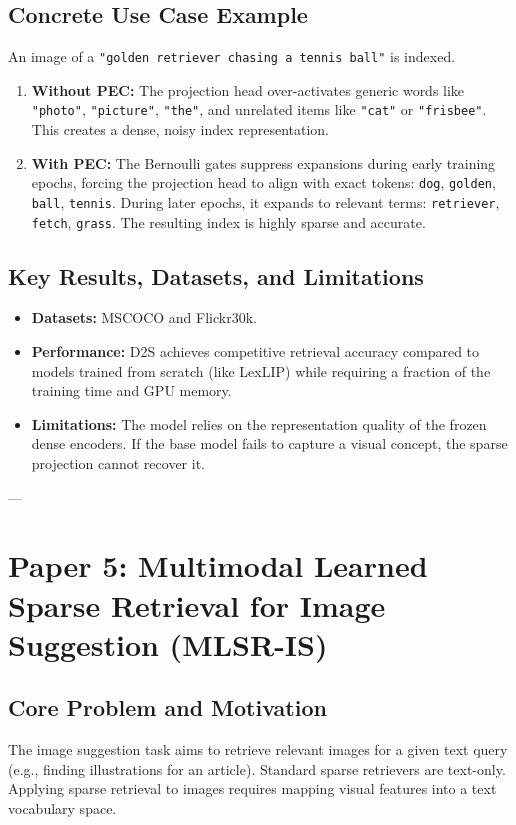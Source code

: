 \documentclass[11pt,a4paper]{article}
\begin{document}
\subsection{Concrete Use Case Example}
An image of a \texttt{"golden retriever chasing a tennis ball"} is indexed.
\begin{enumerate}
    \item \textbf{Without PEC:} The projection head over-activates generic words like \texttt{"photo"}, \texttt{"picture"}, \texttt{"the"}, and unrelated items like \texttt{"cat"} or \texttt{"frisbee"}. This creates a dense, noisy index representation.
    \item \textbf{With PEC:} The Bernoulli gates suppress expansions during early training epochs, forcing the projection head to align with exact tokens: \texttt{dog}, \texttt{golden}, \texttt{ball}, \texttt{tennis}. During later epochs, it expands to relevant terms: \texttt{retriever}, \texttt{fetch}, \texttt{grass}. The resulting index is highly sparse and accurate.
\end{enumerate}

\subsection{Key Results, Datasets, and Limitations}
\begin{itemize}
    \item \textbf{Datasets:} MSCOCO and Flickr30k.
    \item \textbf{Performance:} D2S achieves competitive retrieval accuracy compared to models trained from scratch (like LexLIP) while requiring a fraction of the training time and GPU memory.
    \item \textbf{Limitations:} The model relies on the representation quality of the frozen dense encoders. If the base model fails to capture a visual concept, the sparse projection cannot recover it.
\end{itemize}

---

\section{Paper 5: Multimodal Learned Sparse Retrieval for Image Suggestion (MLSR-IS)}
\label{sec:mlsr_is}

\subsection{Core Problem and Motivation}
The image suggestion task aims to retrieve relevant images for a given text query (e.g., finding illustrations for an article). Standard sparse retrievers are text-only. Applying sparse retrieval to images requires mapping visual features into a text vocabulary space.
\end{document}
